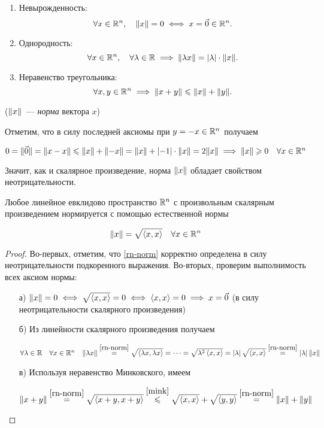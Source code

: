 \documentclass[../../main.tex]{subfiles}
\begin{document}
\begin{enumerate}
 \item Невырожденность:
 \[\forall x \in \mathbb{R}^n, \quad \lVert{x}\rVert = 0 \iff x = \vec 0 \in \mathbb{R}^n.\]
 \item Однородность:
 \[\forall x \in \mathbb{R}^n, \quad \forall \lambda \in \mathbb{R} \implies 
   \lVert{\lambda x}\rVert = \left|{\lambda}\right| \cdot \lVert{x}\rVert.\]
 \item Неравенство треугольника:
 \[\forall x, y \in \mathbb{R}^n \implies \lVert{x+y}\rVert \leqslant \lVert{x}\rVert + \lVert{y}\rVert.\]
\end{enumerate}

($\lVert{x}\rVert$~--- \emph{норма} вектора $x$)

\bigskip

Отметим, что в силу последней аксиомы при $y = -x \in \mathbb{R}^n$ получаем

$0 = \lVert{\vec 0}\rVert = \lVert{x - x}\rVert \leqslant \lVert{x}\rVert + \lVert{-x}\rVert =
 \lVert{x}\rVert + \left|{-1}\right| \cdot \lVert{x}\rVert = 2\lVert{x}\rVert \implies \lVert{x}\rVert \geqslant 0
 \quad \forall x \in \mathbb{R}^n$
 
Значит, как и скалярное произведение, норма $\lVert{x}\rVert$ обладает
свойством неотрицательности.

\begin{thm}
 Любое линейное евклидово пространство $\mathbb{R}^n$ с произвольным скалярным
 произведением нормируется с помощью естественной нормы
 
 \begin{equation}
  \label{rn-norm}
  \lVert{x}\rVert = \sqrt{\left<x, x\right>} \quad \forall x \in \mathbb{R}^n
 \end{equation}
 
\end{thm}

\begin{proof}
 Во-первых, отметим, что \eqref{rn-norm} корректно определена в силу 
 неотрицательности подкоренного выражения. Во-вторых, проверим
 выполнимость всех аксиом нормы:
 
 \begin{enumerate}
  \item[а)]
  $\lVert{x}\rVert = 0 \iff \sqrt{\left<x, x\right>} = 0 \iff
  \left<x, x\right> = 0 \implies x = \vec 0$ (в силу 
  неотрицательности скалярного произведения)
  
  \item[б)]
  Из линейности скалярного произведения получаем
  
  $\forall \lambda \in \mathbb{R} \quad \forall x \in \mathbb{R}^n \quad
   \lVert{\lambda x}\rVert \stackrel{\eqref{rn-norm}}{=}
   \sqrt{\left<\lambda x, \lambda x\right>} = \dots =
   \sqrt{\lambda^2\left<x, x\right>} =
   \left|{\lambda}\right| \sqrt{\left<x, x\right>} \stackrel{\eqref{rn-norm}}{=}
   \left|{\lambda}\right| \lVert{x}\rVert$
 
  \item[в)]
  Используя неравенство Минковского, имеем
  
  $\lVert{x+y}\rVert \stackrel{\eqref{rn-norm}}{=}
   \sqrt{\left<x+y, x+y\right>} \stackrel{\eqref{mink}}{\leqslant}
   \sqrt{\left<x, x\right>} + \sqrt{\left<y, y\right>}
   \stackrel{\eqref{rn-norm}}{=} \lVert{x}\rVert + \lVert{y}\rVert$
 \end{enumerate}
 
\end{proof}
\end{document}
